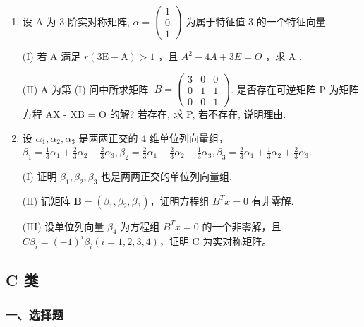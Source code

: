 \documentclass[12pt, a4paper]{ctexart}
\begin{document}
\begin{enumerate}[start=13]
    (II) 求 $ r\left(\mathrm{A}^{50}-\mathrm{E}\right) $

    \item 设 A 为 3 阶实对称矩阵, $ \alpha=\begin{pmatrix}1\\ 0\\ 1\end{pmatrix} $ 为属于特征值 3 的一个特征向量.
    
    (I) 若 A 满足 $ r(3\mathrm{E}-\mathrm{A})>1 $ ，且 $ A^{2}-4A+3E=O $ ，求 A .
    
    (II) A 为第 (I) 问中所求矩阵, $ B = \begin{pmatrix} 3 & 0 & 0 \\ 0 & 1 & 1 \\ 0 & 0 & 1 \end{pmatrix} $. 是否存在可逆矩阵 P 为矩阵方程 AX - XB = O 的解? 若存在, 求 P, 若不存在, 说明理由.

    \item 设 $ \alpha_{1},\alpha_{2},\alpha_{3} $ 是两两正交的 4 维单位列向量组， $ \beta_{1}=\frac{1}{3}\alpha_{1}+\frac{2}{3}\alpha_{2}-\frac{2}{3}\alpha_{3},\beta_{2}=\frac{2}{3}\alpha_{1}-\frac{2}{3}\alpha_{2}-\frac{1}{3}\alpha_{3},\beta_{3}=\frac{2}{3}\alpha_{1}+\frac{1}{3}\alpha_{2}+\frac{2}{3}\alpha_{3}. $
    
    (I) 证明 $ \beta_{1},\beta_{2},\beta_{3} $ 也是两两正交的单位列向量组.
    
    (II) 记矩阵 $ \mathbf{B} = (\beta_1, \beta_2, \beta_3) $，证明方程组 $ B^T x = 0 $ 有非零解.
    
    (III) 设单位列向量 $ \beta_4 $ 为方程组 $ B^T x = 0 $ 的一个非零解，且 $ C\beta_i = (-1)^i \beta_i (i = 1, 2, 3, 4) $，证明 C 为实对称矩阵。
\end{enumerate}

\subsection{C 类}

\subsubsection*{一、选择题}
\end{document}
